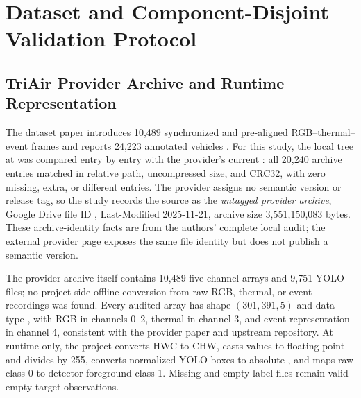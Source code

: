 \documentclass[pdflatex,sn-basic,Numbered,iicol]{sn-jnl}
\begin{document}
\section{Dataset and Component-Disjoint Validation Protocol}
\subsection{TriAir Provider Archive and Runtime Representation}
The dataset paper introduces 10,489 synchronized and pre-aligned RGB--thermal--event frames and reports 24,223 annotated vehicles \cite{iaboni2026trimodal}. For this study, the local tree at  was compared entry by entry with the provider's current : all 20,240 archive entries matched in relative path, uncompressed size, and CRC32, with zero missing, extra, or different entries. The provider assigns no semantic version or release tag, so the study records the source as the \emph{untagged provider archive}, Google Drive file ID , Last-Modified 2025-11-21, archive size 3,551,150,083 bytes. These archive-identity facts are from the authors' complete local audit; the external provider page exposes the same file identity but does not publish a semantic version.

The provider archive itself contains 10,489 five-channel  arrays and 9,751 YOLO  files; no project-side offline conversion from raw RGB, thermal, or event recordings was found. Every audited array has shape $(301,391,5)$ and data type , with RGB in channels 0--2, thermal in channel 3, and event representation in channel 4, consistent with the provider paper and upstream repository. At runtime only, the project converts HWC to CHW, casts  values to floating point and divides by 255, converts normalized YOLO boxes to absolute , and maps raw class 0 to detector foreground class 1. Missing and empty label files remain valid empty-target observations.
\end{document}
